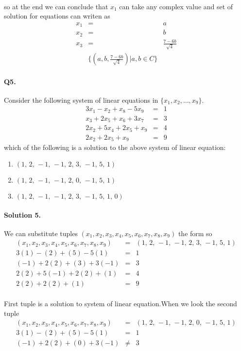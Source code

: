 \documentclass[11pt]{article}
\begin{document}
\paragraph{}so at the end we can conclude that $x_1$ can take any complex value and set of solution for equations can writen as
\begin{eqnarray*}
x_1&=&a
\\x_2&=&b
\\x_3&=&\frac{7-6 b}{\sqrt{4}}
\\ &\{ (a,b,\frac{7-6 b}{\sqrt{4}})|a,b \in C \}&
\end{eqnarray*}

\paragraph{Q5. } Consider the following system of linear equations in
\(\{x_1,x_2,\dots,x_9\}\).
\begin{eqnarray*}
3 x_{1} -  x_{2} + x_{8} - 5 x_{9} &=& 1
\\x_{3} + 2 x_{5} + x_{6} + 3 x_{7} &=& 3
\\2 x_{2} + 5 x_{4} + 2 x_{5} + x_{9} &=& 4
\\2 x_{2} + 2 x_{5} + x_{9} &=& 9
\end{eqnarray*}
which of the following is a solution to the above system of linear equation:
\begin{enumerate}
\item \(\left(1,\,2,\,-1,\,-1,\,2,\,3,\,-1,\,5,\,1\right)\)
\item \(\left(1,\,2,\,-1,\,-1,\,2,\,0,\,-1,\,5,\,1\right)\)
\item \(\left(1,\,2,\,-1,\,-1,\,2,\,3,\,-1,\,5,\,1,\, 0\right)\)
\end{enumerate}

\paragraph{Solution 5.}We can substitute tuples $(x_1,x_2,x_3,x_4,x_5,x_6,x_7,x_8,x_9)$ the form so
\begin{eqnarray*}
(x_1,x_2,x_3,x_4,x_5,x_6,x_7,x_8,x_9)&=&(1,\,2,\,-1,\,-1,\,2,\,3,\,-1,\,5,\,1)
\\3(1) - (2) + (5) - 5(1) &=& 1
\\(-1) + 2(2) + (3) + 3(-1) &=& 3
\\2(2) + 5(-1) + 2(2) + (1) &=& 4
\\2(2) + 2(2) + (1) &=& 9
\end{eqnarray*}
\paragraph{}First tuple is a solution to system of linear equation.When we look the second tuple
\begin{eqnarray*}
(x_1,x_2,x_3,x_4,x_5,x_6,x_7,x_8,x_9)&=&(1,\,2,\,-1,\,-1,\,2,\,0,\,-1,\,5,\,1)
\\3(1) - (2) + (5) - 5(1) &=& 1
\\(-1) + 2(2) + (0) + 3(-1) &\neq & 3
\end{eqnarray*}
\end{document}
